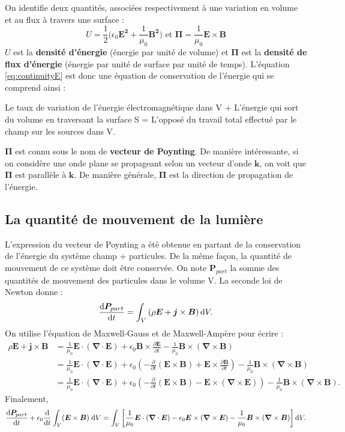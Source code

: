 On identifie deux quantités, associées respectivement à une variation en volume et au flux à travers une surface : 
\begin{equation}
U=\frac{1}{2}\biggl(\epsilon_0\bm{E^2}+\frac{1}{\mu_0}\bm{B^2}\biggr) \mbox{   et   } \bm{\Pi} = \frac{1}{\mu_0}\bm{E}\times\bm{B}
\label{Def.Poynting}
\end{equation}
$U$ est la \textbf{densité d'énergie} (énergie par unité de volume) et $\bm{\Pi}$ est la \textbf{densité de flux d'énergie} (énergie par unité de surface par unité de temps). L'équation \ref{eq:continuityE} est donc une équation de conservation de l'énergie qui se comprend ainsi :

Le taux de variation de l'énergie électromagnétique dans V + L'énergie qui sort du volume en traversant la surface S = L'opposé du travail total effectué par le champ sur les sources dans V.

$\bm{\Pi}$ est connu sous le nom de \textbf{vecteur de Poynting}. De manière intéressante, si on considère une onde plane se propageant selon un vecteur d'onde $\bm{k}$, on voit que $\bm{\Pi}$ est parallèle à $\bm{k}$. De manière générale, $\bm{\Pi}$ est la direction de propagation de l'énergie.

\subsection{La quantité de mouvement de la lumière}
L'expression du vecteur de Poynting a été obtenue en partant de la conservation de l'énergie du système champ + particules. De la même façon, la quantité de mouvement de ce système doit être conservée. On note $\bm{P}_{part}$ la somme des quantités de mouvement des particules dans le volume V. La seconde loi de Newton donne :
\begin{equation}
\frac{\mathrm{d}\bm{P}_{part}}{\mathrm{d} t}=\int_V \left(\rho \bm{E} + \bm{j}\times\bm{B}\right)\mathrm{d} V.
\end{equation} 
On utilise l'équation de Maxwell-Gauss et de Maxwell-Ampère pour écrire :
\begin{align}
\rho \bm{E} + \bm{j}\times\bm{B} &= \frac{1}{\mu_0} \bm{E}\cdot(\bm{\nabla}\cdot\bm{E})+\epsilon_0 \bm{B}\times\frac{\partial \bm{E}}{\partial t}-\frac{1}{\mu_0}\bm{B}\times(\bm{\nabla}\times\bm{B})\\
&= \frac{1}{\mu_0} \bm{E}\cdot(\bm{\nabla}\cdot\bm{E})+\epsilon_0 
\left(-\frac{\partial}{\partial t}(\bm{E}\times\bm{B})+\bm{E}\times\frac{\partial \bm{B}}{\partial t}\right)
-\frac{1}{\mu_0}\bm{B}\times(\bm{\nabla}\times\bm{B})\\
&= \frac{1}{\mu_0} \bm{E}\cdot(\bm{\nabla}\cdot\bm{E})+\epsilon_0\left(-\frac{\partial}{\partial t}(\bm{E}\times\bm{B})-\bm{E}\times(\bm{\nabla}\times\bm{E})\right)
-\frac{1}{\mu_0}\bm{B}\times(\bm{\nabla}\times\bm{B}).
\end{align} 
Finalement,
\begin{equation}
\frac{\mathrm{d}\bm{P}_{part}}{\mathrm{d} t}+\epsilon_0\frac{\mathrm{d}}{\mathrm{d} t}\int_V (\bm{E}\times\bm{B})\; \mathrm{d} V=\int_V \left[\frac{1}{\mu_0} \bm{E}\cdot(\bm{\nabla}\cdot\bm{E})-\epsilon_0\bm{E}\times(\bm{\nabla}\times\bm{E})
-\frac{1}{\mu_0}\bm{B}\times(\bm{\nabla}\times\bm{B})\right]\mathrm{d} V.
\end{equation} 

